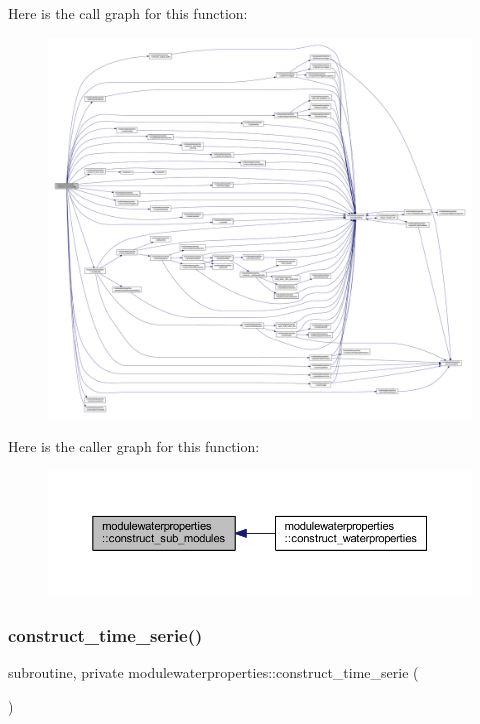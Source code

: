 Here is the call graph for this function\+:\nopagebreak
\begin{figure}[H]
\begin{center}
\leavevmode
\includegraphics[width=350pt]{namespacemodulewaterproperties_aef459b24af9c748df5b5fb96dc4292bb_cgraph}
\end{center}
\end{figure}
Here is the caller graph for this function\+:\nopagebreak
\begin{figure}[H]
\begin{center}
\leavevmode
\includegraphics[width=350pt]{namespacemodulewaterproperties_aef459b24af9c748df5b5fb96dc4292bb_icgraph}
\end{center}
\end{figure}
\mbox{\label{namespacemodulewaterproperties_a0067cb435852460b42999329f0637ab7}} 
\subsubsection{\texorpdfstring{construct\+\_\+time\+\_\+serie()}{construct\_time\_serie()}}
{\footnotesize\ttfamily subroutine, private modulewaterproperties\+::construct\+\_\+time\+\_\+serie (\begin{DoxyParamCaption}{ }\end{DoxyParamCaption})\hspace{0.3cm}{\ttfamily [private]}}


